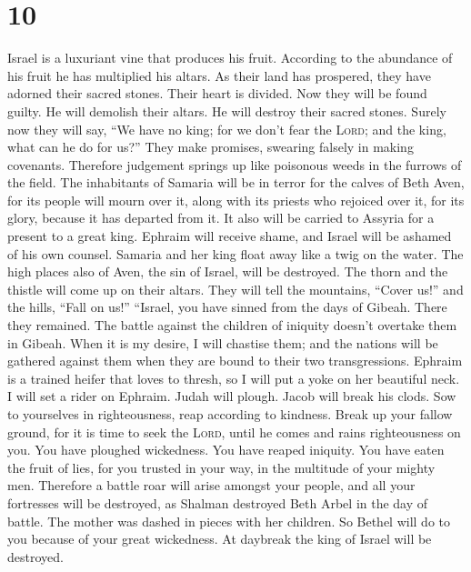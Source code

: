 \hypertarget{section-9}{%
\section{10}\label{section-9}}

 Israel is a luxuriant vine that produces his fruit.
According to the abundance of his fruit he has multiplied his altars. As
their land has prospered, they have adorned their sacred stones.
 Their heart is divided. Now they will be found guilty. He
will demolish their altars. He will destroy their sacred stones.
 Surely now they will say, ``We have no king; for we don't
fear the \textsc{Lord}; and the king, what can he do for us?''
 They make promises, swearing falsely in making covenants.
Therefore judgement springs up like poisonous weeds in the furrows of
the field.  The inhabitants of Samaria will be in terror
for the calves of Beth Aven, for its people will mourn over it, along
with its priests who rejoiced over it, for its glory, because it has
departed from it.  It also will be carried to Assyria for
a present to a great king. Ephraim will receive shame, and Israel will
be ashamed of his own counsel.  Samaria and her king float
away like a twig on the water.  The high places also of
Aven, the sin of Israel, will be destroyed. The thorn and the thistle
will come up on their altars. They will tell the mountains, ``Cover
us!'' and the hills, ``Fall on us!''  ``Israel, you have
sinned from the days of Gibeah. There they remained. The battle against
the children of iniquity doesn't overtake them in Gibeah.
 When it is my desire, I will chastise them; and the
nations will be gathered against them when they are bound to their two
transgressions.  Ephraim is a trained heifer that loves
to thresh, so I will put a yoke on her beautiful neck. I will set a
rider on Ephraim. Judah will plough. Jacob will break his clods.
 Sow to yourselves in righteousness, reap according to
kindness. Break up your fallow ground, for it is time to seek the
\textsc{Lord}, until he comes and rains righteousness on you.
 You have ploughed wickedness. You have reaped iniquity.
You have eaten the fruit of lies, for you trusted in your way, in the
multitude of your mighty men.  Therefore a battle roar
will arise amongst your people, and all your fortresses will be
destroyed, as Shalman destroyed Beth Arbel in the day of battle. The
mother was dashed in pieces with her children.  So Bethel
will do to you because of your great wickedness. At daybreak the king of
Israel will be destroyed.

